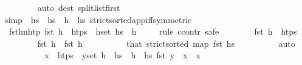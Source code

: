 \begin{isabellebody}
\ \ \ \ \ \ \isamarkupfalse%
\ {\isacharparenleft}{\kern0pt}auto\ dest{\isacharcolon}{\kern0pt}\ split{\isacharunderscore}{\kern0pt}list{\isacharunderscore}{\kern0pt}first{\isacharparenright}{\kern0pt}\isanewline
\isanewline
\ \ \ \ \isamarkupfalse%
{\isacharbrackleft}{\kern0pt}simp{\isacharbrackright}{\kern0pt}\ {\isacharequal}{\kern0pt}\ {\isacartoucheopen}hs{}\ {\isacharequal}{\kern0pt}\ hs{}\ {\isacharat}{\kern0pt}\ h{}\ {\isacharhash}{\kern0pt}\ hs{}{\isacartoucheclose}\ strict{\isacharunderscore}{\kern0pt}sorted{\isacharunderscore}{\kern0pt}app{\isacharunderscore}{\kern0pt}iff{\isacharbrackleft}{\kern0pt}symmetric{\isacharbrackright}{\kern0pt}\isanewline
\isanewline
\ \ \ \ \isamarkupfalse%
\ fst{\isacharunderscore}{\kern0pt}h{}{\isacharprime}{\kern0pt}{\isacharunderscore}{\kern0pt}n{\isacharunderscore}{\kern0pt}htp{\isacharcolon}{\kern0pt}\ {\isachardoublequoteopen}fst\ h{}{\isacharprime}{\kern0pt}\ {\isasymnotin}\ htps{\isachardoublequoteclose}\ \ {\isachardoublequoteopen}h{}{\isacharprime}{\kern0pt}{\isasymin}set\ hs{}{\isacharprime}{\kern0pt}{\isachardoublequoteclose}\ \ h{}{\isacharprime}{\kern0pt}\isanewline
\ \ \ \ \isamarkupfalse%
{\isacharparenleft}{\kern0pt}rule\ ccontr{\isacharcomma}{\kern0pt}\ safe{\isacharparenright}{\kern0pt}\isanewline
\ \ \ \ \ \ \isamarkupfalse%
\ {\isachardoublequoteopen}fst\ h{}{\isacharprime}{\kern0pt}\ {\isasymin}\ htps{\isachardoublequoteclose}\isanewline
\ \ \ \ \ \ \isamarkupfalse%
\ {\isachardoublequoteopen}fst\ h{}{\isacharprime}{\kern0pt}\ {\isacharless}{\kern0pt}\ fst\ h{}{\isachardoublequoteclose}\isanewline
\ \ \ \ \ \ \ \ \isamarkupfalse%
\ that\ {\isacartoucheopen}strict{\isacharunderscore}{\kern0pt}sorted\ {\isacharparenleft}{\kern0pt}map\ fst\ hs{\isacharprime}{\kern0pt}{\isacharparenright}{\kern0pt}{\isacartoucheclose}\isanewline
\ \ \ \ \ \ \ \ \isamarkupfalse%
\ auto\isanewline
\ \ \ \ \ \ \isamarkupfalse%
\ \isamarkupfalse%
\ {\isachardoublequoteopen}x\ {\isasymin}\ htps\ {\isasymLongrightarrow}\ {\isasymexists}y{\isasymin}set\ {\isacharparenleft}{\kern0pt}h\ {\isacharhash}{\kern0pt}\ hs{}\ {\isacharat}{\kern0pt}\ h{}\ {\isacharhash}{\kern0pt}\ hs{}{\isacharparenright}{\kern0pt}{\isachardot}{\kern0pt}\ fst\ y\ {\isacharequal}{\kern0pt}\ x{\isachardoublequoteclose}\ \ x\isanewline

\end{isabellebody}
